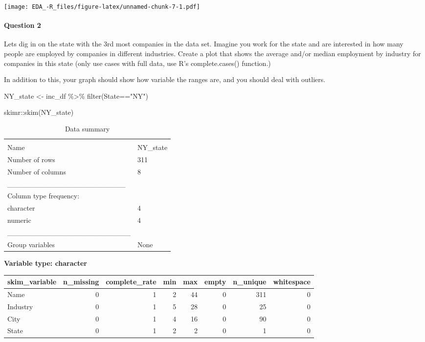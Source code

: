 \documentclass[
]{article}
\newenvironment{Shaded}{\begin{snugshade}}{\end{snugshade}}
\newcommand{\FunctionTok}[1]{\textcolor[rgb]{0.00,0.00,0.00}{#1}}
\newcommand{\NormalTok}[1]{#1}
\newcommand{\OtherTok}[1]{\textcolor[rgb]{0.56,0.35,0.01}{#1}}
\newcommand{\SpecialCharTok}[1]{\textcolor[rgb]{0.00,0.00,0.00}{#1}}
\newcommand{\StringTok}[1]{\textcolor[rgb]{0.31,0.60,0.02}{#1}}
\begin{document}
\texttt{[image: EDA\_-R\_files/figure-latex/unnamed-chunk-7-1.pdf]}

\hypertarget{question-2}{%
\paragraph{Question 2}\label{question-2}}

Lets dig in on the state with the 3rd most companies in the data set.
Imagine you work for the state and are interested in how many people are
employed by companies in different industries. Create a plot that shows
the average and/or median employment by industry for companies in this
state (only use cases with full data, use R's complete.cases()
function.)

In addition to this, your graph should show how variable the ranges are,
and you should deal with outliers.

\begin{Shaded}
\begin{Highlighting}[]
\NormalTok{NY\_state }\OtherTok{\textless{}{-}}\NormalTok{ inc\_df }\SpecialCharTok{\%\textgreater{}\%} 
  \FunctionTok{filter}\NormalTok{(State}\SpecialCharTok{==}\StringTok{"NY"}\NormalTok{)}

\NormalTok{skimr}\SpecialCharTok{::}\FunctionTok{skim}\NormalTok{(NY\_state)}
\end{Highlighting}
\end{Shaded}

\begin{longtable}[]{@{}ll@{}}
\caption{Data summary}\tabularnewline
\toprule
& \\
\midrule
\endfirsthead
\toprule
& \\
\midrule
\endhead
Name & NY\_state \\
Number of rows & 311 \\
Number of columns & 8 \\
\_\_\_\_\_\_\_\_\_\_\_\_\_\_\_\_\_\_\_\_\_\_\_ & \\
Column type frequency: & \\
character & 4 \\
numeric & 4 \\
\_\_\_\_\_\_\_\_\_\_\_\_\_\_\_\_\_\_\_\_\_\_\_\_ & \\
Group variables & None \\
\bottomrule
\end{longtable}

\textbf{Variable type: character}

\begin{longtable}[]{@{}lrrrrrrr@{}}
\toprule
skim\_variable & n\_missing & complete\_rate & min & max & empty &
n\_unique & whitespace \\
\midrule
\endhead
Name & 0 & 1 & 2 & 44 & 0 & 311 & 0 \\
Industry & 0 & 1 & 5 & 28 & 0 & 25 & 0 \\
City & 0 & 1 & 4 & 16 & 0 & 90 & 0 \\
State & 0 & 1 & 2 & 2 & 0 & 1 & 0 \\
\bottomrule
\end{longtable}
\end{document}

